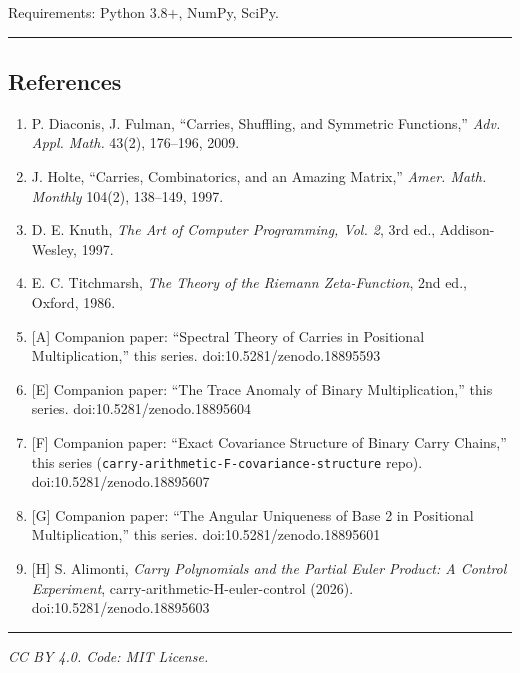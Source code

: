 \documentclass[
  11pt,
]{article}
\providecommand{\tightlist}{%
  \setlength{\itemsep}{0pt}\setlength{\parskip}{0pt}}
\begin{document}
Requirements: Python 3.8+, NumPy, SciPy.

\begin{center}\rule{0.5\linewidth}{0.5pt}\end{center}

\newpage

\subsection{References}\label{references}

\begin{enumerate}
\def\labelenumi{\arabic{enumi}.}
\tightlist
\item
  P. Diaconis, J. Fulman, ``Carries, Shuffling, and Symmetric Functions,''
  \emph{Adv. Appl. Math.} 43(2), 176--196, 2009.
\item
  J. Holte, ``Carries, Combinatorics, and an Amazing Matrix,'' \emph{Amer. Math.
  Monthly} 104(2), 138--149, 1997.
\item
  D. E. Knuth, \emph{The Art of Computer Programming, Vol. 2}, 3rd ed.,
  Addison-Wesley, 1997.
\item
  E. C. Titchmarsh, \emph{The Theory of the Riemann Zeta-Function}, 2nd ed.,
  Oxford, 1986.
\item
  {[}A{]} Companion paper: ``Spectral Theory of Carries in Positional
  Multiplication,'' this series. doi:10.5281/zenodo.18895593
\item
  {[}E{]} Companion paper: ``The Trace Anomaly of Binary Multiplication,'' this
  series. doi:10.5281/zenodo.18895604
\item
  {[}F{]} Companion paper: ``Exact Covariance Structure of Binary Carry
  Chains,'' this series (\texttt{carry-arithmetic-F-covariance-structure} repo).
  doi:10.5281/zenodo.18895607
\item
  {[}G{]} Companion paper: ``The Angular Uniqueness of Base 2 in Positional
  Multiplication,'' this series. doi:10.5281/zenodo.18895601
\item
  {[}H{]} S. Alimonti, \emph{Carry Polynomials and the Partial Euler Product: A
  Control Experiment}, carry-arithmetic-H-euler-control (2026).
  doi:10.5281/zenodo.18895603
\end{enumerate}

\begin{center}\rule{0.5\linewidth}{0.5pt}\end{center}

\emph{CC BY 4.0. Code: MIT License.}
\end{document}

